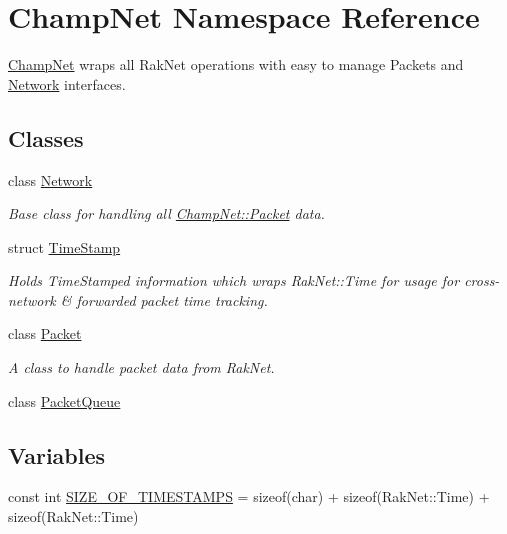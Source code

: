 \hypertarget{namespace_champ_net}{\section{Champ\-Net Namespace Reference}
\label{namespace_champ_net}
}


\hyperlink{namespace_champ_net}{Champ\-Net} wraps all Rak\-Net operations with easy to manage Packets and \hyperlink{class_champ_net_1_1_network}{Network} interfaces.  


\subsection*{Classes}
\begin{DoxyCompactItemize}
\item 
class \hyperlink{class_champ_net_1_1_network}{Network}
\begin{DoxyCompactList}\small\item\em Base class for handling all \hyperlink{class_champ_net_1_1_packet}{Champ\-Net\-::\-Packet} data. \end{DoxyCompactList}\item 
struct \hyperlink{struct_champ_net_1_1_time_stamp}{Time\-Stamp}
\begin{DoxyCompactList}\small\item\em Holds Time\-Stamped information which wraps Rak\-Net\-::\-Time for usage for cross-\/network \& forwarded packet time tracking. \end{DoxyCompactList}\item 
class \hyperlink{class_champ_net_1_1_packet}{Packet}
\begin{DoxyCompactList}\small\item\em A class to handle packet data from Rak\-Net. \end{DoxyCompactList}\item 
class \hyperlink{class_champ_net_1_1_packet_queue}{Packet\-Queue}
\end{DoxyCompactItemize}
\subsection*{Variables}
\begin{DoxyCompactItemize}
\item 
const int \hyperlink{namespace_champ_net_ae8bece8e869e20f234d9ae67256a735f}{S\-I\-Z\-E\-\_\-\-O\-F\-\_\-\-T\-I\-M\-E\-S\-T\-A\-M\-P\-S} = sizeof(char) + sizeof(Rak\-Net\-::\-Time) + sizeof(Rak\-Net\-::\-Time)
\end{DoxyCompactItemize}


